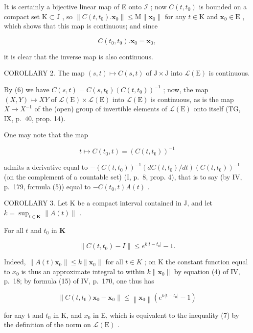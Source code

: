 It is certainly a bijective linear map of E onto \(\mathcal{I}\) ; now \(C(t, t_0)\) is bounded on a compact set \(\mathrm{K} \subset \mathrm{J}\) , so \(\|C(t, t_0). \mathbf{x}_0\| \leqslant \mathrm{M} \| \mathbf{x}_0\|\) for any \(t \in \mathrm{K}\) and \(\mathbf{x}_0 \in \mathrm{E}\) , which shows that this map is continuous; and since

\[
C (t _ {0}, t _ {0}). \mathbf {x} _ {0} = \mathbf {x} _ {0},
\]

it is clear that the inverse map is also continuous.

COROLLARY 2. The map \((s,t)\mapsto C(s,t)\) of \(\mathrm{J}\times \mathrm{J}\) into \(\mathcal{L}(\mathrm{E})\) is continuous.

By (6) we have \(C(s, t) = C(s, t_0) \left( C(t, t_0) \right)^{-1}\) ; now, the map \((X, Y) \mapsto XY\) of \(\mathcal{L}(\mathrm{E}) \times \mathcal{L}(\mathrm{E})\) into \(\mathcal{L}(\mathrm{E})\) is continuous, as is the map \(X \mapsto X^{-1}\) of the (open) group of invertible elements of \(\mathcal{L}(\mathrm{E})\) onto itself (TG, IX, p.~40, prop. 14).

One may note that the map

\[
t \mapsto C (t _ {0}, t) = (C (t, t _ {0})) ^ {- 1}
\]

admits a derivative equal to \(-(C(t,t_{0}))^{-1}(dC(t,t_{0})/dt)(C(t,t_{0}))^{-1}\) (on the complement of a countable set) (I, p.~8, prop. 4), that is to say (by IV, p.~179, formula (5)) equal to \(-C(t_{0},t)A(t)\) .

COROLLARY 3. Let K be a compact interval contained in J, and let \(k = \sup_{t \in \mathbf{K}} \| A(t) \|\) .

For all \(t\) and \(t_0\) in \(\mathbf{K}\)

\[
\left\| C \left(t, t _ {0}\right) - I \right\| \leqslant e ^ {k \left| t - t _ {0} \right|} - 1.\tag{7}
\]

Indeed, \(\|A(t)\mathbf{x}_{0}\|\leqslant k\|\mathbf{x}_{0}\|\) for all \(t\in K\) ; on K the constant function equal to \(x_{0}\) is thus an approximate integral to within \(k\|\mathbf{x}_{0}\|\) by equation (4) of IV, p.~18; by formula (15) of IV, p.~170, one thus has

\[
\left\| C \left(t, t _ {0}\right) \mathbf {x} _ {0} - \mathbf {x} _ {0} \right\| \leqslant \left\| \mathbf {x} _ {0} \right\| \left(e ^ {k | t - t _ {0} |} - 1\right)
\]

for any t and \(t_{0}\) in K, and \(x_{0}\) in E, which is equivalent to the inequality (7) by the definition of the norm on \(\mathcal{L}(\mathrm{E})\) .

